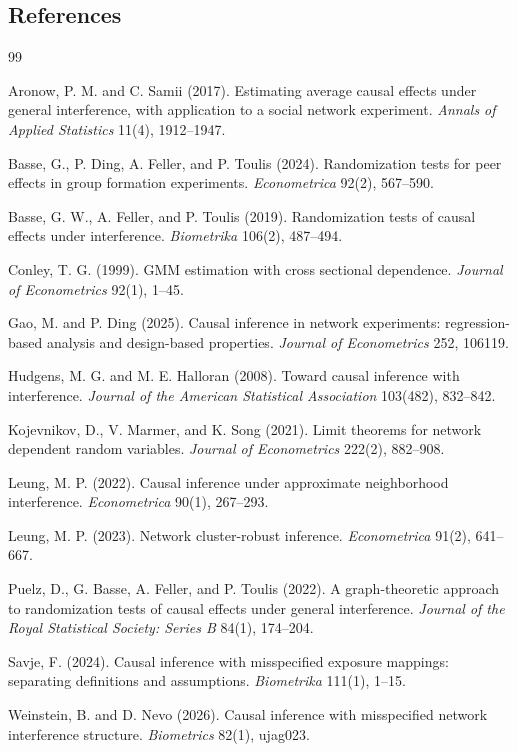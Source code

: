 \documentclass[11pt]{article}
\theoremstyle{definition}
\theoremstyle{plain}
\theoremstyle{remark}
\begin{document}
\subsection*{References}
\begin{thebibliography}{99}

Aronow, P. M. and C. Samii (2017).
Estimating average causal effects under general interference, with application
to a social network experiment.
\emph{Annals of Applied Statistics} 11(4), 1912--1947.

Basse, G., P. Ding, A. Feller, and P. Toulis (2024).
Randomization tests for peer effects in group formation experiments.
\emph{Econometrica} 92(2), 567--590.

Basse, G. W., A. Feller, and P. Toulis (2019).
Randomization tests of causal effects under interference.
\emph{Biometrika} 106(2), 487--494.

Conley, T. G. (1999).
GMM estimation with cross sectional dependence.
\emph{Journal of Econometrics} 92(1), 1--45.

Gao, M. and P. Ding (2025).
Causal inference in network experiments: regression-based analysis and
design-based properties.
\emph{Journal of Econometrics} 252, 106119.

Hudgens, M. G. and M. E. Halloran (2008).
Toward causal inference with interference.
\emph{Journal of the American Statistical Association} 103(482), 832--842.

Kojevnikov, D., V. Marmer, and K. Song (2021).
Limit theorems for network dependent random variables.
\emph{Journal of Econometrics} 222(2), 882--908.

Leung, M. P. (2022).
Causal inference under approximate neighborhood interference.
\emph{Econometrica} 90(1), 267--293.

Leung, M. P. (2023).
Network cluster-robust inference.
\emph{Econometrica} 91(2), 641--667.

Puelz, D., G. Basse, A. Feller, and P. Toulis (2022).
A graph-theoretic approach to randomization tests of causal effects under
general interference.
\emph{Journal of the Royal Statistical Society: Series B} 84(1), 174--204.

Savje, F. (2024).
Causal inference with misspecified exposure mappings: separating definitions
and assumptions.
\emph{Biometrika} 111(1), 1--15.

Weinstein, B. and D. Nevo (2026).
Causal inference with misspecified network interference structure.
\emph{Biometrics} 82(1), ujag023.

\end{thebibliography}
\end{document}
